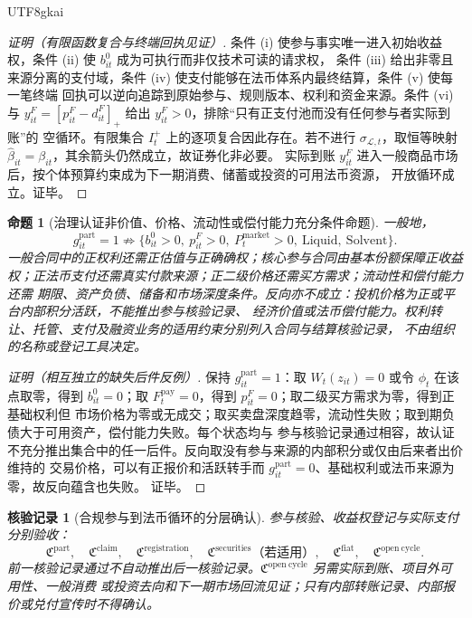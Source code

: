 \documentclass[12pt,a4paper,openany]{report}
\newtheorem{proposition}{命题}[chapter]
\newtheorem{Certificate}{核验记录}[chapter]
\begin{document}
\begin{CJK*}{UTF8}{gkai}
\begin{proof}[证明（有限函数复合与终端回执见证）]
条件 (i) 使参与事实唯一进入初始收益权，条件 (ii) 使 \(b_{it}^{0}\) 成为可执行而非仅技术可读的请求权，
条件 (iii) 给出非零且来源分离的支付域，条件 (iv) 使支付能够在法币体系内最终结算，条件 (v) 使每一笔终端
回执可以逆向追踪到原始参与、规则版本、权利和资金来源。条件 (vi) 与
\(y_{it}^{F}=[p_{it}^{F}-d_{it}^{F}]_+\) 给出 \(y_{it}^{F}>0\)，排除“只有正支付池而没有任何参与者实际到账”的
空循环。有限集合 \(I_t^+\) 上的逐项复合因此存在。若不进行
\(\sigma_{\mathcal L,t}\)，取恒等映射 \(\widehat\beta_{it}=\beta_{it}\)，其余箭头仍然成立，故证券化非必要。
实际到账 \(y_{it}^{F}\) 进入一般商品市场后，按个体预算约束成为下一期消费、储蓄或投资的可用法币资源，
开放循环成立。证毕。
\end{proof}

\begin{proposition}[治理认证非价值、价格、流动性或偿付能力充分条件命题]
\label{prop:certification-not-value-liquidity}
一般地，
\[
  g_{it}^{\mathrm{part}}=1
  \not\Longrightarrow
  \{b_{it}^{0}>0,\ p_{it}^{F}>0,\ P_t^{\mathrm{market}}>0,
  \ \mathrm{Liquid},\ \mathrm{Solvent}\}.
\]
一般合同中的正权利还需正估值与正确确权；核心参与合同由基本份额保障正收益权；正法币支付还需真实付款来源；正二级价格还需买方需求；流动性和偿付能力还需
期限、资产负债、储备和市场深度条件。反向亦不成立：投机价格为正或平台内部积分活跃，不能推出参与核验记录、
经济价值或法币偿付能力。权利转让、托管、支付及融资业务的适用约束分别列入合同与结算核验记录，
不由组织的名称或登记工具决定。
\end{proposition}

\begin{proof}[证明（相互独立的缺失后件反例）]
保持 \(g_{it}^{\mathrm{part}}=1\)：取 \(W_t(z_{it})=0\) 或令 \(\phi_t\) 在该点取零，得到
\(b_{it}^{0}=0\)；取 \(F_t^{\mathrm{pay}}=0\)，得到 \(p_{it}^{F}=0\)；取二级买方需求为零，得到正基础权利但
市场价格为零或无成交；取买卖盘深度趋零，流动性失败；取到期负债大于可用资产，偿付能力失败。每个状态均与
参与核验记录通过相容，故认证不充分推出集合中的任一后件。反向取没有参与来源的内部积分或仅由后来者出价维持的
交易价格，可以有正报价和活跃转手而 \(g_{it}^{\mathrm{part}}=0\)、基础权利或法币来源为零，故反向蕴含也失败。
证毕。
\end{proof}

\begin{Certificate}[合规参与到法币循环的分层确认]
参与核验、收益权登记与实际支付分别验收：
\[
  \mathfrak C^{\mathrm{part}},\quad
  \mathfrak C^{\mathrm{claim}},\quad
  \mathfrak C^{\mathrm{registration}},\quad
  \mathfrak C^{\mathrm{securities}}\text{（若适用）},\quad
  \mathfrak C^{\mathrm{fiat}},\quad
  \mathfrak C^{\mathrm{open\ cycle}}.
\]
前一核验记录通过不自动推出后一核验记录。\(\mathfrak C^{\mathrm{open\ cycle}}\) 另需实际到账、项目外可用性、一般消费
或投资去向和下一期市场回流见证；只有内部转账记录、内部报价或兑付宣传时不得确认。
\end{Certificate}


\end{CJK*}
\end{document}
